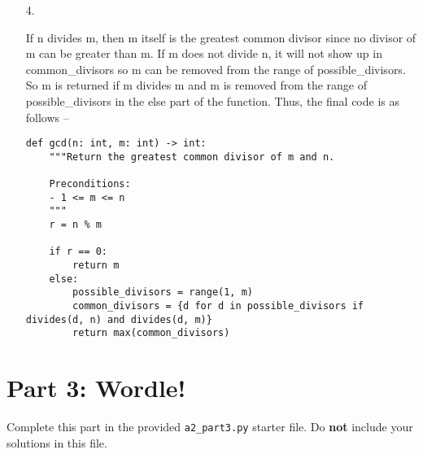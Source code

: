 \documentclass[11pt]{article}
\newcommand{\code}[1]{\texttt{#1}}
\begin{document}
\begin{enumerate}
\begin{proof}
\end{proof}

\item[4.]

If n divides m, then m itself is the greatest common divisor since no divisor of m can be greater than m. If m does not divide n, it will not show up in common\_divisors so m can be removed from the range of possible\_divisors. So m is returned if m divides m and m is removed from the range of possible\_divisors in the else part of the function. Thus, the final code is as follows --

\begin{verbatim}
def gcd(n: int, m: int) -> int:
    """Return the greatest common divisor of m and n.

    Preconditions:
    - 1 <= m <= n
    """
    r = n % m

    if r == 0:
        return m
    else:
        possible_divisors = range(1, m)
        common_divisors = {d for d in possible_divisors if divides(d, n) and divides(d, m)}
        return max(common_divisors)
\end{verbatim}
\end{enumerate}


\section*{Part 3: Wordle!}

Complete this part in the provided \code{a2\_part3.py} starter file.
Do \textbf{not} include your solutions in this file.
\end{document}
